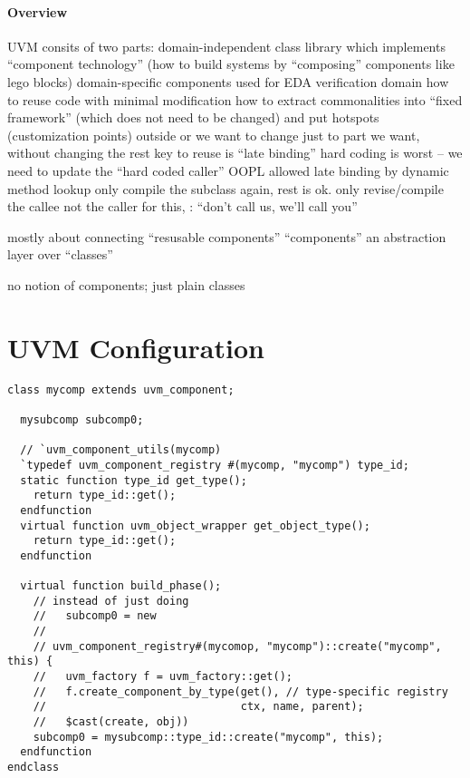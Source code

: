 \documentclass{note}
\begin{document}
\small


\paragraph{Overview}
\bit
\w  UVM consits of two parts: 
  \bit
  \w domain-independent class library which implements ``component
  technology'' (how to build systems by ``composing'' components like lego
  blocks) 
  \w domain-specific components used for EDA verification domain
  \eit
\w {}
  \bit
  \w how to reuse code with minimal modification
  \w how to extract commonalities into ``fixed framework'' (which does not
  need to be changed) and put hotspots (customization points) outside
  \w or we want to change just to part we want, without changing the rest
  \w key to reuse is ``late binding'' 
     \bit
     \w hard coding is worst -- we need to update the ``hard coded caller''
     \w OOPL allowed late binding by dynamic method lookup
     \w only compile the subclass again, rest is ok. only revise/compile the
         callee not the caller
         \bit
         \w for this, : ``don't call us, we'll call you''
         \eit
     \eit
  \eit

\w {}
  \bit
  \w mostly about connecting ``resusable components''
  \w ``components'' an abstraction layer over ``classes''
  \eit

\w {}
  \bit
  \w no notion of components; just plain classes
  \w 
  \eit
\eit

\section{UVM Configuration}

\begin{verbatim}
class mycomp extends uvm_component;

  mysubcomp subcomp0;

  // `uvm_component_utils(mycomp)
  `typedef uvm_component_registry #(mycomp, "mycomp") type_id;
  static function type_id get_type(); 
    return type_id::get();
  endfunction
  virtual function uvm_object_wrapper get_object_type(); 
    return type_id::get();
  endfunction

  virtual function build_phase();
    // instead of just doing
    //   subcomp0 = new
    // 
    // uvm_component_registry#(mycomop, "mycomp")::create("mycomp", this) {
    //   uvm_factory f = uvm_factory::get();
    //   f.create_component_by_type(get(), // type-specific registry
    //                              ctx, name, parent);
    //   $cast(create, obj))
    subcomp0 = mysubcomp::type_id::create("mycomp", this);
  endfunction
endclass
\end{verbatim}
\end{document}
